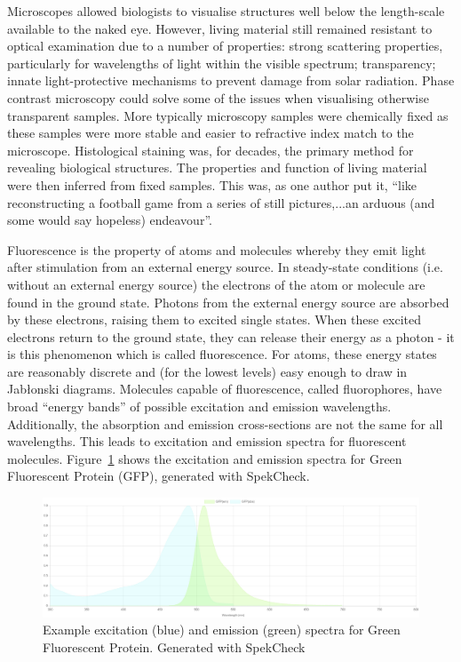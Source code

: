 Microscopes allowed biologists to visualise structures well below the 
length-scale available to the naked eye. However, living material still 
remained resistant to optical examination due to a number of properties: 
strong scattering properties, particularly for wavelengths of light 
within the visible spectrum; transparency; innate light-protective 
mechanisms to prevent damage from solar radiation. Phase contrast 
microscopy could solve some of the issues when visualising otherwise 
transparent samples\cite{burch1942phase}. More typically microscopy 
samples were chemically fixed as these samples were more stable and 
easier to refractive index match to the microscope. Histological staining 
was, for decades, the primary method for revealing biological structures\cite{alturkistani2016histological}. The properties and function 
of living material were then inferred from fixed samples. This was, as one 
author put it, ``like reconstructing a football game from a series of still 
pictures,...an arduous (and some would say hopeless) 
endeavour''\cite{yuste2005fluorescence}. 

Fluorescence is the property of atoms and molecules whereby they emit light
after stimulation from an external energy source. In steady-state conditions 
(i.e. without an external energy source) the electrons of the atom or 
molecule are found in the ground state. Photons from the external energy 
source are absorbed by these electrons, raising them to excited single states.
When these excited electrons return to the ground state, they can release 
their energy as a photon - it is this phenomenon which is called fluorescence\cite{ghiran2011introduction}. For atoms, these energy states are
reasonably discrete and (for the lowest levels) easy enough to draw in 
Jab\l{}onski diagrams. Molecules capable of fluorescence, called fluorophores, 
have broad ``energy bands'' of possible excitation and emission wavelengths. 
Additionally, the absorption and emission cross-sections are not the same for
all wavelengths. This leads to excitation and emission spectra for fluorescent
molecules. Figure~\ref{fig:GFP_emission_absorption_spectra} shows the 
excitation and emission spectra for Green Fluorescent Protein (GFP), generated 
with SpekCheck\cite{phillips2018spekcheck}.

\begin{figure}[h]
	\centering
	\includegraphics[width=\textwidth]{images/GFP_emission_absorption_spectra.jpg}
	\caption[Example excitation and emission spectra]{Example excitation (blue) 
		and emission (green) spectra for Green Fluorescent Protein. Generated with SpekCheck\cite{phillips2018spekcheck}}
	\label{fig:GFP_emission_absorption_spectra}
\end{figure}

